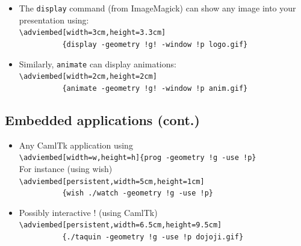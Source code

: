 \documentclass[12pt]{article}
\begin{document}
\begin{itemize}
\item The \verb"display" command (from ImageMagick) can show any image into your
presentation using:\\
\verb|\adviembed[width=3cm,height=3.3cm]|\\
\verb|          {display -geometry !g! -window !p logo.gif}|\\

\item Similarly, \verb|animate| can display animations:\\
        \verb|\adviembed[width=2cm,height=2cm]|\\
        \verb|          {animate -geometry !g! -window !p anim.gif}|\\
\end{itemize}

% 
% 


\newpage

\subsection* {Embedded applications (cont.)}

\begin{itemize}
  \item Any CamlTk application using\\
   \verb+\adviembed[width=w,height=h]{prog -geometry !g -use !p}+\\
   For instance (using wish)\\
   \verb|\adviembed[persistent,width=5cm,height=1cm]|\\
   \verb|          {wish ./watch -geometry !g -use !p}|\\
\adviwait
  \item Possibly interactive ! (using CamlTk)\\
   \verb|\adviembed[persistent,width=6.5cm,height=9.5cm]|\\
   \verb|          {./taquin -geometry !g -use !p dojoji.gif}|\\

\end{itemize}
\end{document}
